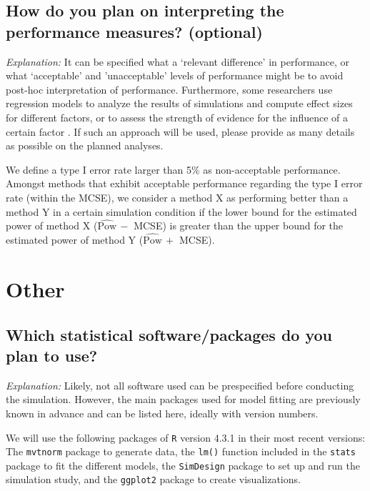 \documentclass[12pt]{article}
\begin{document}
\subsection{How do you plan on interpreting the performance measures? \textmd{(optional)}}
    
\textit{Explanation:} It can be specified what a `relevant difference' in performance, or what `acceptable' and 'unacceptable' levels of performance might be to avoid post-hoc interpretation of performance. Furthermore, some researchers use regression models to analyze the results of simulations and compute effect sizes for different factors, or to assess the strength of evidence for the influence of a certain factor \parencite{Skrondal2000, Chipman2022}. If such an approach will be used, please provide as many details as possible on the planned analyses. 
    
\begin{examplebox}
We define a type I error rate larger than 5\% as non-acceptable performance. Amongst methods that exhibit acceptable performance regarding the type I error rate (within the MCSE), we consider a method X as performing better than a method Y in a certain simulation condition if the lower bound for the estimated power of method X ($\widehat{\text{Pow}} \,-$ MCSE) is greater than the upper bound for the estimated power of method Y ($\widehat{\text{Pow}} \,+$ MCSE).
\end{examplebox} 


\section{Other}
\subsection{Which statistical software/packages do you plan to use?}   
\textit{Explanation:} Likely, not all software used can be prespecified before conducting the simulation. However, the main packages used for model fitting are previously known in advance and can be listed here, ideally with version numbers. 
    
\begin{examplebox}
We will use the following packages of \texttt{R} version 4.3.1 \parencite{R2020} in their most recent versions: The \texttt{mvtnorm} package \parencite{Genz2009} to generate data, the \texttt{lm()} function included in the \texttt{stats} package \parencite{R2020} to fit the different models, the \texttt{SimDesign} package \parencite{Chalmers2020} to set up  and run the simulation study, and the \texttt{ggplot2} package \parencite{Wickham2016} to create visualizations.  
\end{examplebox}
\end{document}

